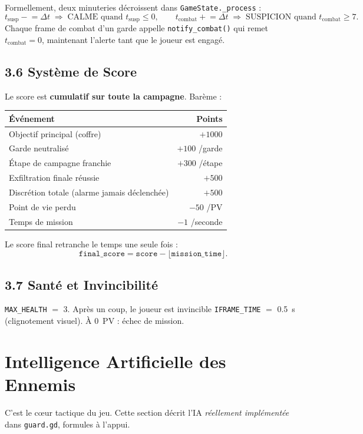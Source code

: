 \documentclass[11pt,a4paper]{article}
\newcommand{\code}[1]{\colorbox{codebg}{\texttt{#1}}}
\newcommand{\param}[2]{\code{#1} $=$ #2}
\begin{document}
Formellement, deux minuteries d\'ecroissent dans \code{GameState.\_process} :
\[
t_{\text{susp}} \mathrel{-}= \Delta t \;\Rightarrow\; \text{CALME quand } t_{\text{susp}}\leq 0,
\qquad
t_{\text{combat}} \mathrel{+}= \Delta t \;\Rightarrow\; \text{SUSPICION quand } t_{\text{combat}}\geq 7.
\]
Chaque frame de combat d'un garde appelle \code{notify\_combat()} qui remet
$t_{\text{combat}}\!=\!0$, maintenant l'alerte tant que le joueur est engag\'e.

\subsection{3.6 Syst\`eme de Score}
Le score est \textbf{cumulatif sur toute la campagne}. Bar\`eme :

\begin{center}
\begin{tabular}{lr}
\toprule
\textbf{\'Ev\'enement} & \textbf{Points} \\
\midrule
Objectif principal (coffre) & $+1000$ \\
Garde neutralis\'e & $+100$ /garde \\
\'Etape de campagne franchie & $+300$ /\'etape \\
Exfiltration finale r\'eussie & $+500$ \\
Discr\'etion totale (alarme jamais d\'eclench\'ee) & $+500$ \\
Point de vie perdu & $-50$ /PV \\
Temps de mission & $-1$ /seconde \\
\bottomrule
\end{tabular}
\end{center}

Le score final retranche le temps une seule fois :
\[
\texttt{final\_score} = \texttt{score} - \big\lfloor \texttt{mission\_time} \big\rfloor .
\]

\subsection{3.7 Sant\'e et Invincibilit\'e}
\param{MAX\_HEALTH}{3}. Apr\`es un coup, le joueur est invincible
\param{IFRAME\_TIME}{0.5}~s (clignotement visuel). \`A $0$~PV : \'echec de mission.

\section{Intelligence Artificielle des Ennemis}
C'est le c\oe ur tactique du jeu. Cette section d\'ecrit l'IA \emph{r\'eellement
impl\'ement\'ee} dans \code{guard.gd}, formules \`a l'appui.
\end{document}
